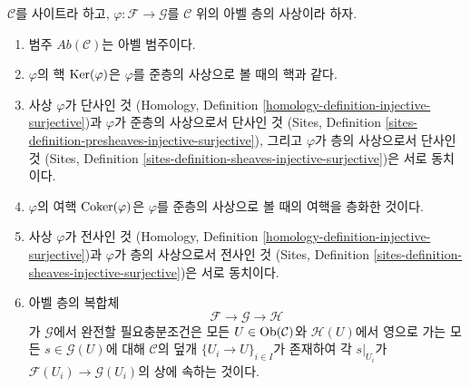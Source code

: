 \begin{lemma}
\label{lemma-abelian-abelian}
$\mathcal{C}$를 사이트라 하고, $\varphi : \mathcal{F} \to \mathcal{G}$를
$\mathcal{C}$ 위의 아벨 층의 사상이라 하자.
\begin{enumerate}
\item 범주 $\textit{Ab}(\mathcal{C})$는 아벨 범주이다.
\item $\varphi$의 핵 $\mathop{\mathrm{Ker}}(\varphi)$은 $\varphi$를 준층의 사상으로 볼 때의
핵과 같다.
\item 사상 $\varphi$가 단사인 것
(Homology, Definition \ref{homology-definition-injective-surjective})과
$\varphi$가 준층의 사상으로서 단사인 것
(Sites, Definition \ref{sites-definition-presheaves-injective-surjective}),
그리고 $\varphi$가 층의 사상으로서 단사인 것
(Sites, Definition \ref{sites-definition-sheaves-injective-surjective})은
서로 동치이다.
\item $\varphi$의 여핵 $\mathop{\mathrm{Coker}}(\varphi)$은 $\varphi$를 준층의 사상으로
볼 때의 여핵을 층화한 것이다.
\item 사상 $\varphi$가 전사인 것
(Homology, Definition \ref{homology-definition-injective-surjective})과
$\varphi$가 층의 사상으로서 전사인 것
(Sites, Definition \ref{sites-definition-sheaves-injective-surjective})은
서로 동치이다.
\item 아벨 층의 복합체
$$
\mathcal{F} \to \mathcal{G} \to \mathcal{H}
$$
가 $\mathcal{G}$에서 완전할 필요충분조건은 모든
$U \in \mathop{\mathrm{Ob}}\nolimits(\mathcal{C})$와 $\mathcal{H}(U)$에서 영으로 가는 모든
$s \in \mathcal{G}(U)$에 대해 $\mathcal{C}$의 덮개
$\{U_i \to U\}_{i \in I}$가 존재하여 각 $s|_{U_i}$가
$\mathcal{F}(U_i) \to \mathcal{G}(U_i)$의 상에 속하는 것이다.
\end{enumerate}
\end{lemma}

